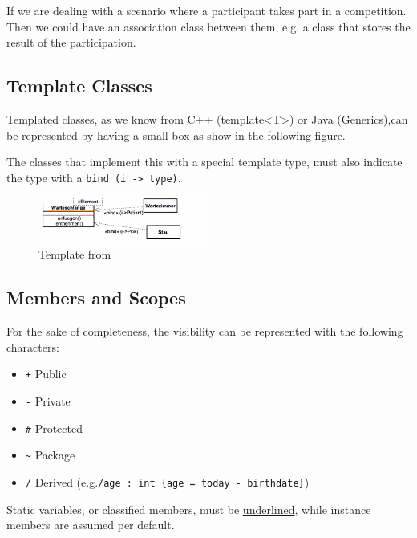 \documentclass[../main/main.tex]{subfiles}
\begin{document}
If we are dealing with a scenario where a participant takes part in a
competition. Then we could have an association class between them, e.g. a
class that stores the result of the participation. 


\subsection{Template Classes}

Templated classes, as we know from C++ (template<T>) or Java (Generics),can be
represented by having a small box as show in the following figure. 

The classes that implement this with a special template type, must also indicate
the type with a \lstinline|bind (i -> type)|.

\begin{figure}[h!]
  \includegraphics[width=0.5\textwidth]{../figures/umltemplate.png}
  \caption{Template from \cite{oestereich:kurzreferenz}}
\end{figure}


\subsection{Members and Scopes}

For the sake of completeness, the visibility can be represented with the
following characters: 

\begin{itemize}
  \item[] \lstinline|+| Public
  \item[] \lstinline|-| Private
  \item[] \lstinline|#| Protected
  \item[] \lstinline|~| Package
  \item[] \lstinline|/| Derived (e.g.\lstinline|/age : int {age = today - birthdate}|)
\end{itemize}

Static variables, or classified members, must be \underline{underlined}, while instance
members are assumed per default.
\end{document}
